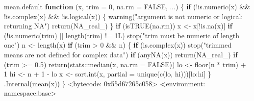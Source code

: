 \documentclass[
  10pt,
  a4paper]{book}
\newenvironment{Shaded}{\begin{snugshade}}{\end{snugshade}}
\newcommand{\AttributeTok}[1]{\textcolor[rgb]{0.77,0.63,0.00}{#1}}
\newcommand{\ConstantTok}[1]{\textcolor[rgb]{0.00,0.00,0.00}{#1}}
\newcommand{\ControlFlowTok}[1]{\textcolor[rgb]{0.13,0.29,0.53}{\textbf{#1}}}
\newcommand{\DecValTok}[1]{\textcolor[rgb]{0.00,0.00,0.81}{#1}}
\newcommand{\ErrorTok}[1]{\textcolor[rgb]{0.64,0.00,0.00}{\textbf{#1}}}
\newcommand{\FloatTok}[1]{\textcolor[rgb]{0.00,0.00,0.81}{#1}}
\newcommand{\FunctionTok}[1]{\textcolor[rgb]{0.00,0.00,0.00}{#1}}
\newcommand{\NormalTok}[1]{#1}
\newcommand{\OtherTok}[1]{\textcolor[rgb]{0.56,0.35,0.01}{#1}}
\newcommand{\SpecialCharTok}[1]{\textcolor[rgb]{0.00,0.00,0.00}{#1}}
\newcommand{\StringTok}[1]{\textcolor[rgb]{0.31,0.60,0.02}{#1}}
\begin{document}
\begin{Shaded}
\begin{Highlighting}[]
\NormalTok{mean.default}
\ControlFlowTok{function}\NormalTok{ (x, }\AttributeTok{trim =} \DecValTok{0}\NormalTok{, }\AttributeTok{na.rm =} \ConstantTok{FALSE}\NormalTok{, ...) }
\NormalTok{\{}
    \ControlFlowTok{if}\NormalTok{ (}\SpecialCharTok{!}\FunctionTok{is.numeric}\NormalTok{(x) }\SpecialCharTok{\&\&} \SpecialCharTok{!}\FunctionTok{is.complex}\NormalTok{(x) }\SpecialCharTok{\&\&} \SpecialCharTok{!}\FunctionTok{is.logical}\NormalTok{(x)) \{}
        \FunctionTok{warning}\NormalTok{(}\StringTok{"argument is not numeric or logical: returning NA"}\NormalTok{)}
        \FunctionTok{return}\NormalTok{(}\ConstantTok{NA\_real\_}\NormalTok{)}
\NormalTok{    \}}
    \ControlFlowTok{if}\NormalTok{ (}\FunctionTok{isTRUE}\NormalTok{(na.rm)) }
\NormalTok{        x }\OtherTok{\textless{}{-}}\NormalTok{ x[}\SpecialCharTok{!}\FunctionTok{is.na}\NormalTok{(x)]}
    \ControlFlowTok{if}\NormalTok{ (}\SpecialCharTok{!}\FunctionTok{is.numeric}\NormalTok{(trim) }\SpecialCharTok{||} \FunctionTok{length}\NormalTok{(trim) }\SpecialCharTok{!=}\NormalTok{ 1L) }
        \FunctionTok{stop}\NormalTok{(}\StringTok{"\textquotesingle{}trim\textquotesingle{} must be numeric of length one"}\NormalTok{)}
\NormalTok{    n }\OtherTok{\textless{}{-}} \FunctionTok{length}\NormalTok{(x)}
    \ControlFlowTok{if}\NormalTok{ (trim }\SpecialCharTok{\textgreater{}} \DecValTok{0} \SpecialCharTok{\&\&}\NormalTok{ n) \{}
        \ControlFlowTok{if}\NormalTok{ (}\FunctionTok{is.complex}\NormalTok{(x)) }
            \FunctionTok{stop}\NormalTok{(}\StringTok{"trimmed means are not defined for complex data"}\NormalTok{)}
        \ControlFlowTok{if}\NormalTok{ (}\FunctionTok{anyNA}\NormalTok{(x)) }
            \FunctionTok{return}\NormalTok{(}\ConstantTok{NA\_real\_}\NormalTok{)}
        \ControlFlowTok{if}\NormalTok{ (trim }\SpecialCharTok{\textgreater{}=} \FloatTok{0.5}\NormalTok{) }
            \FunctionTok{return}\NormalTok{(stats}\SpecialCharTok{::}\FunctionTok{median}\NormalTok{(x, }\AttributeTok{na.rm =} \ConstantTok{FALSE}\NormalTok{))}
\NormalTok{        lo }\OtherTok{\textless{}{-}} \FunctionTok{floor}\NormalTok{(n }\SpecialCharTok{*}\NormalTok{ trim) }\SpecialCharTok{+} \DecValTok{1}
\NormalTok{        hi }\OtherTok{\textless{}{-}}\NormalTok{ n }\SpecialCharTok{+} \DecValTok{1} \SpecialCharTok{{-}}\NormalTok{ lo}
\NormalTok{        x }\OtherTok{\textless{}{-}} \FunctionTok{sort.int}\NormalTok{(x, }\AttributeTok{partial =} \FunctionTok{unique}\NormalTok{(}\FunctionTok{c}\NormalTok{(lo, hi)))[lo}\SpecialCharTok{:}\NormalTok{hi]}
\NormalTok{    \}}
    \FunctionTok{.Internal}\NormalTok{(}\FunctionTok{mean}\NormalTok{(x))}
\NormalTok{\}}
\SpecialCharTok{\textless{}}\NormalTok{bytecode}\SpecialCharTok{:} \DecValTok{0x55d67265c058}\SpecialCharTok{\textgreater{}}
\ErrorTok{\textless{}}\NormalTok{environment}\SpecialCharTok{:}\NormalTok{ namespace}\SpecialCharTok{:}\NormalTok{base}\SpecialCharTok{\textgreater{}}
\end{Highlighting}
\end{Shaded}
\end{document}
